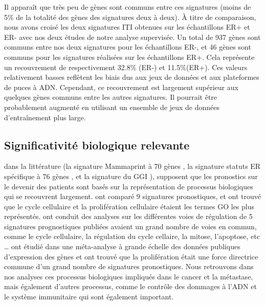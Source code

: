 			Il apparaît que très peu de gènes sont communs entre ces signatures (moins de 5\% de la totalité des gènes des signatures deux à deux).
			À titre de comparaison, nous avons croisé les deux signatures ITI obtenues sur les échantillons ER+ et ER- avec nos deux études de notre analyse supervisée.
			Un total de 937 gènes sont communs entre nos deux signatures pour les échantillons ER-, et 46 gènes sont communs pour les signatures réalisées sur les échantillons ER+.
			Cela représente un recouvrement de respectivement 32.8\% (ER-) et 11.5\%(ER+).
			Ces valeurs relativement basses reflètent les biais dus aux jeux de données et aux plateformes de puces à ADN.
			Cependant, ce recouvrement est largement supérieur aux quelques gènes communs entre les autres signatures.
			Il pourrait être probablement augmenté en utilisant un ensemble de jeux de données d'entraînement plus large.

		\subsection{\textcolor{blue!45!black}{Significativité biologique relevante}}
			 dans la littérature (la signature Mammaprint à 70 gènes \citep{vandevijver2002}, la signature statuts ER spécifique à 76 gènes \citep{Wang2005}, et la signature du \acs{GGI} \citep{Sotiriou2006}), \citeauthor{HaibeKains2008} supposent que les pronostics sur le devenir des patients sont basés sur la représentation de processus biologiques qui se recouvrent largement.
			\citeauthor{Thomassen2007} ont comparé 9 signatures pronostiques, et ont trouvé que le cycle cellulaire et la prolifération cellulaire étaient les termes \acs{GO} les plus représentés.
			\citeauthor{Yu2007} ont conduit des analyses sur les différentes voies de régulation de 5 signatures prognostiques publiées avaient un grand nombre de voies en commun, comme le cycle cellulaire, la régulation du cycle cellaire, la mitose, l'apoptose, etc \dots
			\citeauthor{HaibeKains2008} ont étudié dans une méta-analyse à grande échelle des données publiques d'expression des gènes et ont trouvé que la prolifération était une force directrice commune d'un grand nombre de signatures pronostiques.
			Nous retrouvons dans nos analyses ces processus biologiques impliqués dans le cancer et la métastase, mais également d'autres processus, comme le contrôle des dommages à l'ADN et le système immunitaire qui sont également important.

